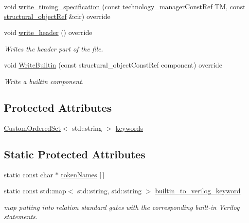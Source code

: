 \begin{DoxyCompactItemize}
\item 
void \hyperlink{classverilog__writer_a19adf1be19b905787d523ecbf8e654aa}{write\+\_\+timing\+\_\+specification} (const technology\+\_\+manager\+Const\+Ref TM, const \hyperlink{structural__objects_8hpp_a8ea5f8cc50ab8f4c31e2751074ff60b2}{structural\+\_\+object\+Ref} \&cir) override
\item 
void \hyperlink{classverilog__writer_a36a19f7e6beea0b3d1c16389397cf9ea}{write\+\_\+header} () override
\begin{DoxyCompactList}\small\item\em Writes the header part of the file. \end{DoxyCompactList}\item 
void \hyperlink{classverilog__writer_ae6de8e08344d96fdc22cfef1974b59fa}{Write\+Builtin} (const structural\+\_\+object\+Const\+Ref component) override
\begin{DoxyCompactList}\small\item\em Write a builtin component. \end{DoxyCompactList}\end{DoxyCompactItemize}
\subsection*{Protected Attributes}
\begin{DoxyCompactItemize}
\item 
\hyperlink{classCustomOrderedSet}{Custom\+Ordered\+Set}$<$ std\+::string $>$ \hyperlink{classverilog__writer_a9f92a193bda2a4e3541592da303b112e}{keywords}
\end{DoxyCompactItemize}
\subsection*{Static Protected Attributes}
\begin{DoxyCompactItemize}
\item 
static const char $\ast$ \hyperlink{classverilog__writer_adbbb8a6e0f6c3c951c7a31741275a1c3}{token\+Names} \mbox{[}$\,$\mbox{]}
\item 
static const std\+::map$<$ std\+::string, std\+::string $>$ \hyperlink{classverilog__writer_a4ee76148a5f6bc7b24a8c40fb189024c}{builtin\+\_\+to\+\_\+verilog\+\_\+keyword}
\begin{DoxyCompactList}\small\item\em map putting into relation standard gates with the corresponding built-\/in Verilog statements. \end{DoxyCompactList}\end{DoxyCompactItemize}

